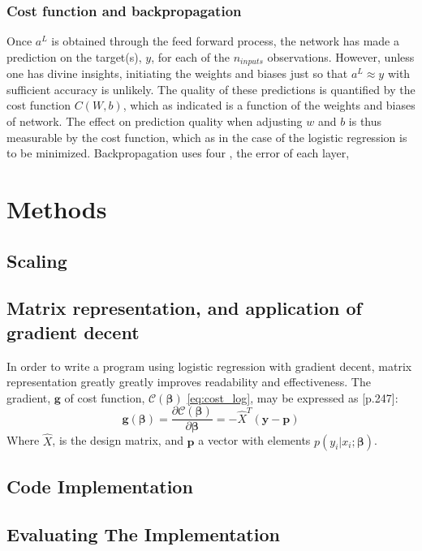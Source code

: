 \documentclass[%
oneside,                 %
final,                   %
10pt]{article}
\begin{document}
\subsubsection{Cost function and backpropagation}
Once $a^L$ is obtained through the feed forward process, the network has made a prediction on the target(s), $y$, for each of the $n_{inputs}$ observations. However, unless one has divine insights, initiating the weights and biases just so that $a^L \approx y$ with sufficient accuracy is unlikely. The quality of these  predictions is quantified by the cost function $C(W,b)$, which as indicated is a function of the weights and biases of network. The effect on prediction quality when adjusting $w$ and $b$ is thus measurable by the cost function, which as in the case of the logistic regression is to be minimized. Backpropagation uses four , the error of each layer,

\section{Methods}\label{Section_Methods}
\subsection{Scaling} \label{Section_M_Scaling}
\subsection{Matrix representation, and application of gradient decent} \label{Section_M_Matrixrep}
In order to write a program using logistic regression with gradient decent, matrix representation greatly greatly improves readability and effectiveness. The gradient, $\bm g$ of cost function, $\mathcal{C}(\bm{\beta})$ \eqref{eq:cost_log}, may be expressed as \citep{MLMurphy}[p.247]:
\begin{equation}
\bm g (\bm \beta)= \frac{\partial \mathcal{C}(\bm{\beta})}{\partial \bm \beta}= -\hat{X}^T(\bm y-\bm p )
\end{equation}
Where $\hat{X}$, is the design matrix, and $\bm p$ a vector with elements $p(y_i|x_i;\bm \beta)$.



\subsection{Code Implementation} \label{Section_M_Codeimpl}
\subsection{Evaluating The Implementation} \label{Section_M_eval}
\end{document}
